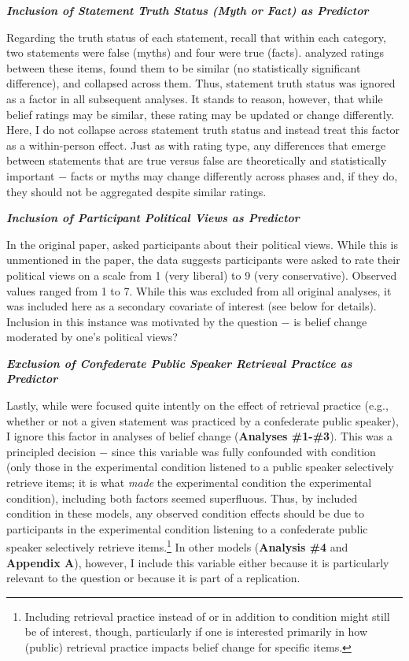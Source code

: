 \documentclass[12pt]{article}  %
\begin{document}

\doublespacing

\noindent\textbf{\textit{Inclusion of Statement Truth Status (Myth or Fact) as Predictor}}

Regarding the truth status of each statement, recall that within each category, two statements were false (myths) and four were true (facts). \textcite{vlasceanu_synchronization_2020} analyzed ratings between these items, found them to be similar (no statistically significant difference), and collapsed across them. Thus, statement truth status was ignored as a factor in all subsequent analyses. It stands to reason, however, that while belief ratings may be similar, these rating may be updated or change differently. Here, I do not collapse across statement truth status and instead treat this factor as a within-person effect. Just as with rating type, any differences that emerge between statements that are true versus false are theoretically and statistically important $-$ facts or myths may change differently across phases and, if they do, they should not be aggregated despite similar ratings.

\noindent\textbf{\textit{Inclusion of Participant Political Views as Predictor}}

In the original paper, \textcite{vlasceanu_synchronization_2020} asked participants about their political views. While this is unmentioned in the paper, the data suggests participants were asked to rate their political views on a scale from 1 (very liberal) to 9 (very conservative). Observed values ranged from 1 to 7. While this was excluded from all original analyses, it was included here as a secondary covariate of interest (see below for details). Inclusion in this instance was motivated by the question $-$ is belief change moderated by one's political views?

\noindent\textbf{\textit{Exclusion of Confederate Public Speaker Retrieval Practice as Predictor}}

Lastly, while \textcite{vlasceanu_synchronization_2020} were focused quite intently on the effect of retrieval practice (e.g., whether or not a given statement was practiced by a confederate public speaker), I ignore this factor in analyses of belief change (\textbf{Analyses \#1-\#3}). This was a principled decision $-$ since this variable was fully confounded with condition (only those in the experimental condition listened to a public speaker selectively retrieve items; it is what \textit{made} the experimental condition the experimental condition), including both factors seemed superfluous. Thus, by included condition in these models, any observed condition effects should be due to participants in the experimental condition listening to a confederate public speaker selectively retrieve items.\footnote{Including retrieval practice instead of or in addition to condition might still be of interest, though, particularly if one is interested primarily in how (public) retrieval practice impacts belief change for specific items.} In other models (\textbf{Analysis \#4} and \textbf{Appendix A}), however, I include this variable either because it is particularly relevant to the question or because it is part of a replication. 
\end{document}

